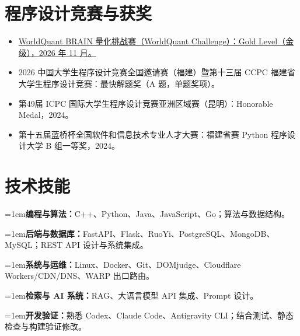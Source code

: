 \documentclass[10pt,a4paper]{article}
\newcommand{\skillrow}[2]{%
  \par\noindent\hangindent=1em\hangafter=1\textbf{#1：}#2\par
}
\begin{document}
\section{程序设计竞赛与获奖}
\begin{itemize}
  \item \href{https://au1bhi.com/files/WorldQuant-Challenge-Gold-Certificate.pdf}{WorldQuant BRAIN 量化挑战赛（WorldQuant Challenge）：Gold Level（金级），2026 年 11 月。}
  \item 2026 中国大学生程序设计竞赛全国邀请赛（福建）暨第十三届 CCPC 福建省大学生程序设计竞赛：最快解题奖（A 题，单题奖项）。
  \item 第49届 ICPC 国际大学生程序设计竞赛亚洲区域赛（昆明）：Honorable Medal，2024。
  \item 第十五届蓝桥杯全国软件和信息技术专业人才大赛：福建省赛 Python 程序设计大学 B 组一等奖，2024。
\end{itemize}
\section{技术技能}
\skillrow{编程与算法}{C++、Python、Java、JavaScript、Go；算法与数据结构。}
\skillrow{后端与数据库}{FastAPI、Flask、RuoYi、PostgreSQL、MongoDB、MySQL；REST API 设计与系统集成。}
\skillrow{系统与运维}{Linux、Docker、Git、DOMjudge、Cloudflare Workers/CDN/DNS、WARP 出口路由。}
\skillrow{检索与 AI 系统}{RAG、大语言模型 API 集成、Prompt 设计。}
\skillrow{开发验证}{熟悉 Codex、Claude Code、Antigravity CLI；结合测试、静态检查与构建验证修改。}
\end{document}
